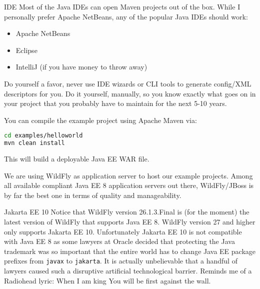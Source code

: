 \begin{TIP}{IDE}
Most of the Java IDEs can open Maven projects out of the box.
While I personally prefer Apache NetBeans,
any of the popular Java IDEs should work:
\begin{itemize}
	\item Apache NetBeans
	\item Eclipse
	\item IntelliJ (if you have money to throw away)
\end{itemize}
Do yourself a favor,
never use IDE wizards or CLI tools to generate config/XML descriptors for you.
Do it yourself, manually, so you know exactly what goes on in your project that you probably have to maintain for the next 5-10 years.
\end{TIP}

You can compile the example project using Apache Maven via:
\begin{lstlisting}[language=bash]
cd examples/helloworld
mvn clean install
\end{lstlisting}
This will build a deployable Java EE WAR file.

We are using WildFly \cite{WildFly} as application server to host our example projects.
Among all available compliant Java EE 8 application servers out there,
WildFly/JBoss is by far the best one in terms of quality and manageability.

\begin{ClownComputing}{Jakarta EE 10}
	Notice that WildFly version 26.1.3.Final is (for the moment) the latest version of WildFly that supports Java EE 8.
	WildFly version 27 and higher only supports Jakarta EE 10.
	Unfortunately Jakarta EE 10 is not compatible with Java EE 8 as some lawyers at Oracle decided that protecting the Java trademark was so important that the entire world has to change Java EE package prefixes from \texttt{javax} to \texttt{jakarta}.
	It is actually unbelievable that a handful of lawyers caused such a disruptive artificial technological barrier.
	Reminds me of a Radiohead lyric: When I am king
	You will be first against the wall.
\end{ClownComputing}


